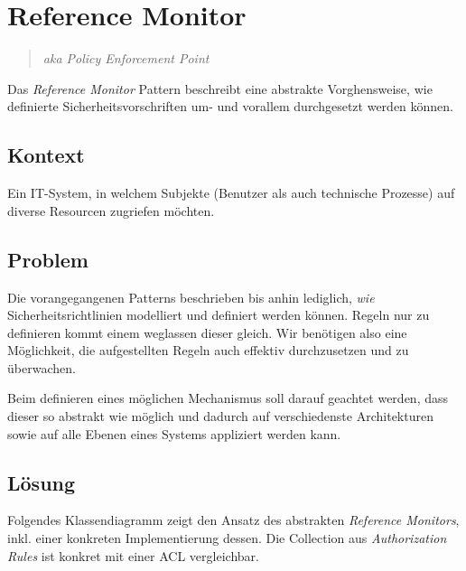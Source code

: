 \section{Reference Monitor}

\begin{quote}\emph{aka Policy Enforcement Point}\end{quote}

Das \emph{Reference Monitor} Pattern beschreibt eine abstrakte Vorghensweise, wie definierte Sicherheitsvorschriften um- und vorallem durchgesetzt werden können.

\subsection*{Kontext}
Ein IT-System, in welchem Subjekte (Benutzer als auch technische Prozesse) auf diverse Resourcen zugriefen möchten.

\subsection*{Problem}
Die vorangegangenen Patterns beschrieben bis anhin lediglich, \emph{wie} Sicherheitsrichtlinien modelliert und definiert werden können.
Regeln nur zu definieren kommt einem weglassen dieser gleich. Wir benötigen also eine Möglichkeit, die aufgestellten Regeln auch effektiv durchzusetzen und zu überwachen.

Beim definieren eines möglichen Mechanismus soll darauf geachtet werden, dass dieser so abstrakt wie möglich und dadurch auf verschiedenste Architekturen sowie auf alle Ebenen eines Systems appliziert werden kann.

\subsection*{Lösung}
Folgendes Klassendiagramm zeigt den Ansatz des abstrakten \emph{Reference Monitors}, inkl. einer konkreten Implementierung dessen.
Die Collection aus \emph{Authorization Rules} ist konkret mit einer \gls{ACL} vergleichbar.

